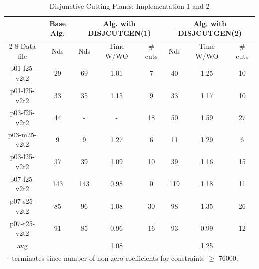 \begin{table}[!htbp]
\centering
\caption{Disjunctive Cutting Planes: Implementation 1 and 2 }\label{tab:disj-imp12}
\begin {tabular}[!h]{|c|c|c|c|c|c|c|c|}
\hline
\mbox{} & Base Alg. & \multicolumn{3}{|c|}{Alg. with DISJCUTGEN(1)} & \multicolumn{3}{|c|}{Alg. with DISJCUTGEN(2)} \\\cline{2-8}
Data file & Nds  & Nds & Time W/WO & \# cuts & Nds & Time W/WO & \# cuts \\\hline
p01-f25-v2t2 &  29  & 69    & 1.01  & 7 & 40    & 1.25  & 10    \\
p01-l25-v2t2 &  33  & 35    & 1.15  & 9 & 33    & 1.17  & 10    \\
p03-f25-v2t2 &  44  & - & - & 18    & 50    & 1.59  & 27    \\
p03-m25-v2t2 &  9   & 9 & 1.27  & 6 & 11    & 1.29  & 6 \\
p03-l25-v2t2 &  37  & 39    & 1.09  & 10    & 39    & 1.16  & 15    \\
p07-f25-v2t2 &  143 & 143   & 0.98  & 0 & 119   & 1.18  & 11    \\
p07-s25-v2t2 &  85  & 96    & 1.08  & 30    & 98    & 1.35  & 26    \\
p07-t25-v2t2 &  91  & 85    & 0.96  & 16    & 93    & 0.99  & 12    \\\hline
avg & \mbox{}   & \mbox{} & 1.08 & \mbox{} & \mbox{}    & 1.25  & \mbox{}\\\hline
\multicolumn{8}{l}{- terminates since number of non zero coefficients for constraints $\geq$ 76000.}
\end{tabular}
\end{table}

